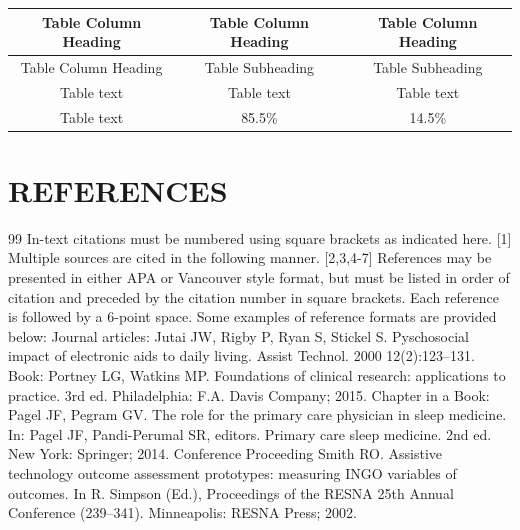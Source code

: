 \documentclass{article}
\begin{document}



\begin{table}[htbp]
\centering
\begin{tabular}{|c|c|c|}
\hline
Table Column Heading & Table Column Heading & Table Column Heading \\
\hline
Table Column Heading & Table Subheading & Table Subheading \\
\hline
Table text & Table text & Table text \\
\hline
Table text & 85.5\% & 14.5\% \\
\hline
\end{tabular}
\end{table}

\section{REFERENCES}


\begin{thebibliography}{99}
\bibitem{} In-text citations must be numbered using square brackets as indicated here. [1] Multiple sources are cited in the following manner. [2,3,4-7] References may be presented in either APA or Vancouver style format, but must be listed in order of citation and preceded by the citation number in square brackets. Each reference is followed by a 6-point space. Some examples of reference formats are provided below:
\bibitem{} Journal articles:
 Jutai JW, Rigby P, Ryan S, Stickel S. Pyschosocial impact of electronic aids to daily living. Assist Technol. 2000 12(2):123–131.
\bibitem{} Book:
 Portney LG, Watkins MP. Foundations of clinical research: applications to practice. 3rd ed. Philadelphia: F.A. Davis Company; 2015.
\bibitem{} Chapter in a Book:
 Pagel JF, Pegram GV. The role for the primary care physician in sleep medicine. In: Pagel JF, Pandi-Perumal SR, editors. Primary care sleep medicine. 2nd ed. New York: Springer; 2014.
\bibitem{} Conference Proceeding
 Smith RO. Assistive technology outcome assessment prototypes: measuring INGO variables of outcomes. In R. Simpson (Ed.), Proceedings of the RESNA 25th Annual Conference (239–341). Minneapolis: RESNA Press; 2002.
\end{thebibliography}
\end{document}
